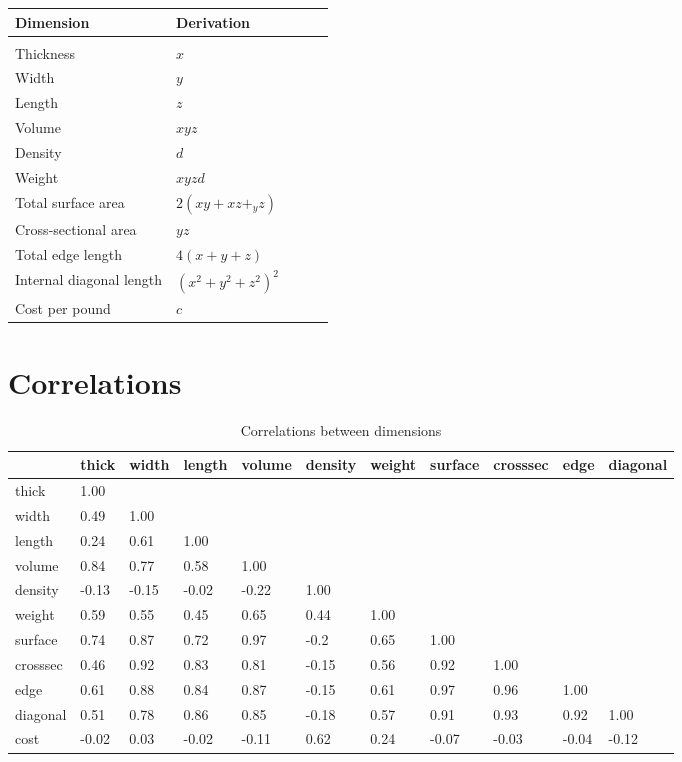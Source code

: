 \documentclass[
]{book}
\begin{document}
\begin{table}[]
\begin{tabular}{lllll}
 Dimension &  Derivation  &  \\
 \hline \\
 Thickness &  $x$  \\
 Width & $y$ \\
 Length & $z$ \\
 Volume & $xyz$ \\
 Density & $d$ \\
 Weight & $xyzd$ \\
 Total surface area & $2(xy + xz +_ yz)$ \\
 Cross-sectional area & $yz$ \\
 Total edge length & $4(x +  y + z)$ \\
 Internal diagonal length & $(x^2 + y^2 + z^2)^2$ \\
 Cost per pound & $c$
\end{tabular}
\end{table}

\hypertarget{correlations}{%
\section{Correlations}\label{correlations}}

\tiny
\begin{table}

\caption{\label{tab:unnamed-chunk-36}Correlations between dimensions}
\centering
\begin{tabular}[t]{l|l|l|l|l|l|l|l|l|l|l}
\hline
  & thick & width & length & volume & density & weight & surface & crosssec & edge & diagonal\\
\hline
thick & 1.00 &  &  &  &  &  &  &  &  & \\
\hline
width & 0.49 & 1.00 &  &  &  &  &  &  &  & \\
\hline
length & 0.24 & 0.61 & 1.00 &  &  &  &  &  &  & \\
\hline
volume & 0.84 & 0.77 & 0.58 & 1.00 &  &  &  &  &  & \\
\hline
density & -0.13 & -0.15 & -0.02 & -0.22 & 1.00 &  &  &  &  & \\
\hline
weight & 0.59 & 0.55 & 0.45 & 0.65 & 0.44 & 1.00 &  &  &  & \\
\hline
surface & 0.74 & 0.87 & 0.72 & 0.97 & -0.2 & 0.65 & 1.00 &  &  & \\
\hline
crosssec & 0.46 & 0.92 & 0.83 & 0.81 & -0.15 & 0.56 & 0.92 & 1.00 &  & \\
\hline
edge & 0.61 & 0.88 & 0.84 & 0.87 & -0.15 & 0.61 & 0.97 & 0.96 & 1.00 & \\
\hline
diagonal & 0.51 & 0.78 & 0.86 & 0.85 & -0.18 & 0.57 & 0.91 & 0.93 & 0.92 & 1.00\\
\hline
cost & -0.02 & 0.03 & -0.02 & -0.11 & 0.62 & 0.24 & -0.07 & -0.03 & -0.04 & -0.12\\
\hline
\end{tabular}
\end{table}
\end{document}
